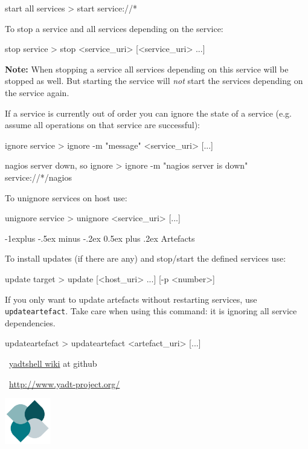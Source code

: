 \documentclass[10pt,landscape]{article}
\makeatletter
\renewcommand{\subsection}{\@startsection{subsection}{2}{0mm}%
                                {-1explus -.5ex minus -.2ex}%
                                {0.5ex plus .2ex}%
                                {\normalfont\normalsize\bfseries}}
\newcommand{\note}[1]{\medskip\textbf{Note:} {#1}\medskip}
\makeatother
\begin{document}
\begin{multicols}{3}
\begin{examples}{start all services}
> start service://*
\end{examples}

To stop a service and all services depending on the service:
\begin{commands}{stop service}
> stop <service_uri> [<service_uri> ...]
\end{commands}

\note{When stopping a service all services depending on this service will be
stopped as well. But starting the service will \emph{not} start the services
depending on the service again.}


If a service is currently out of order you can ignore the state of a service
(e.g. assume all operations on that service are successful):
\begin{commands}{ignore service}
> ignore -m "message" <service_uri> [...]
\end{commands}

\begin{examples}{nagios server down, so ignore}
> ignore -m "nagios server is down" service://*/nagios
\end{examples}

To unignore services on host use:
\begin{commands}{unignore service}
> unignore <service_uri> [...]
\end{commands}



\subsection{Artefacts}

To install updates (if there are any) and stop/start the defined services use:
\begin{commands}{update target}
> update [<host_uri> ...] [-p <number>]
\end{commands}


If you only want to update artefacts without restarting services,
use \verb+updateartefact+. Take care when using this command:
it is ignoring all service dependencies.
\begin{commands}{updateartefact}
> updateartefact <artefact_uri> [...]
\end{commands}



\begin{minipage}[b]{5cm}
~\hfill\href{https://github.com/yadt/yadtshell/wiki}{yadtshell wiki} at github

~\hfill\href{http://www.yadt-project.org/}{http://www.yadt-project.org/}
\end{minipage}%
\hfill%
\includegraphics[width=2cm,valign=b]{res/yadtlogo}%

\end{multicols}
\end{document}
